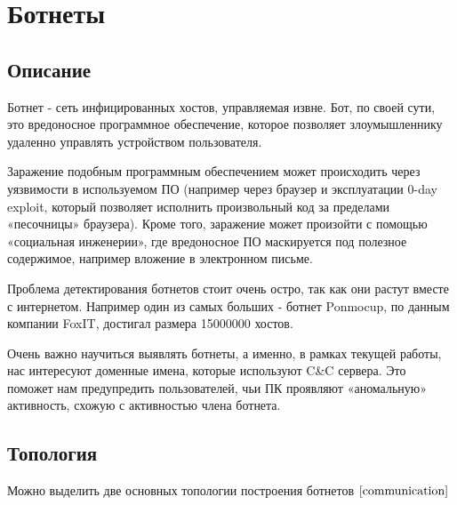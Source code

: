 \documentclass[14pt]{extreport} %
\begin{document}
\chapter{Ботнеты}
\section{Описание}
Ботнет - сеть инфицированных хостов, управляемая извне. Бот, по своей сути, это вредоносное программное обеспечение, которое позволяет злоумышленнику удаленно управлять устройством пользователя.
	
Заражение подобным программным обеспечением может происходить через
уязвимости в используемом ПО (например через браузер и эксплуатации 0-day
exploit, который позволяет исполнить произвольный код за пределами
«песочницы» браузера). Кроме того, заражение может произойти с помощью
«социальная инженерии», где вредоносное ПО маскируется под полезное
содержимое, например вложение в электронном письме.

Проблема детектирования ботнетов стоит очень остро, так как они растут вместе с интернетом. Например один из самых больших - ботнет Ponmocup, по данным компании FoxIT, достигал размера 15000000 хостов.
	
Очень важно научиться выявлять ботнеты, а именно, в рамках текущей
работы, нас интересуют доменные имена, которые используют C\&C сервера.
Это поможет нам предупредить пользователей, чьи ПК проявляют
«аномальную» активность, схожую с активностью члена ботнета.
	
\newpage
\section{Топология}
Можно выделить две основных топологии построения ботнетов $\cite{communication}$
	
\end{document}

